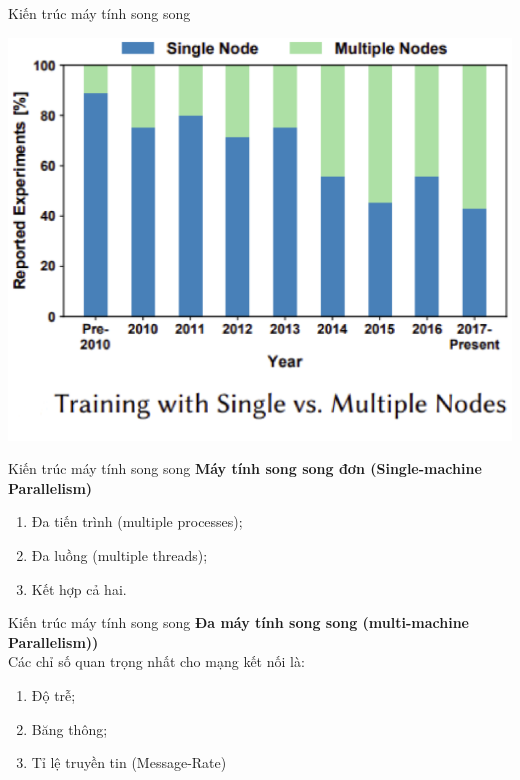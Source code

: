 \documentclass[notheorems,hyperref={bookmarks=true}]{beamer}
\theoremstyle{plain}
\numberwithin{equation}{section}
\begin{document}
\begin{footnotesize}
\begin{frame}{Kiến trúc máy tính song song}
\begin{center}
\includegraphics[scale=0.35]{KTSS1.PNG}
\end{center}
\end{frame}


\begin{frame}{Kiến trúc máy tính song song}
\textbf{Máy tính song song đơn (Single-machine Parallelism)}\pause
\begin{enumerate}[-]
	\item Đa tiến trình (multiple processes);
	\item Đa luồng (multiple threads);
	\item Kết hợp cả hai.
\end{enumerate}
\end{frame}

\begin{frame}{Kiến trúc máy tính song song}
\textbf{Đa máy tính song song (multi-machine Parallelism))}\\ \pause
Các chỉ số quan trọng nhất cho mạng kết nối là:
\begin{enumerate}[-]
		\item Độ trễ;
		\item Băng thông;
		\item Tỉ lệ truyền tin (Message-Rate)
\end{enumerate}
\end{frame}



\end{footnotesize}
\end{document}
